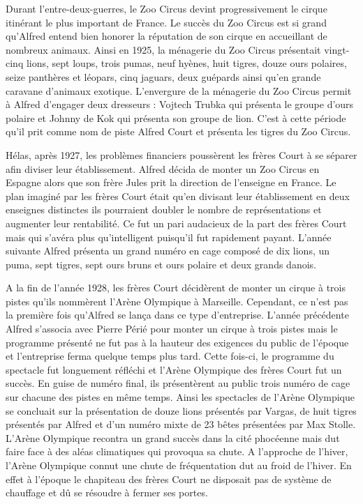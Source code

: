 Durant l’entre-deux-guerres, le Zoo Circus devint progressivement le cirque itinérant le plus important de France. Le succès du Zoo Circus est si grand qu’Alfred entend bien honorer la réputation de son cirque en accueillant de nombreux animaux. Ainsi en 1925, la ménagerie du Zoo Circus présentait vingt-cinq lions, sept loups, trois pumas, neuf hyènes, huit tigres, douze ours polaires, seize panthères et léopars, cinq jaguars, deux guépards ainsi qu’en grande caravane d’animaux exotique. L’envergure de la ménagerie du Zoo Circus permit à Alfred d’engager deux dresseurs : Vojtech Trubka qui présenta le groupe d’ours polaire et Johnny de Kok qui présenta son groupe de lion. C’est à cette période qu’il prit comme nom de piste Alfred Court et présenta les tigres du Zoo Circus. 

Hélas, après 1927, les problèmes financiers poussèrent les frères Court à se séparer afin diviser leur établissement. Alfred décida de monter un Zoo Circus en Espagne alors que son frère Jules prit la direction de l’enseigne en France. Le plan imaginé par les frères Court était qu’en divisant leur établissement en deux enseignes distinctes ils pourraient doubler le nombre de représentations et augmenter leur rentabilité. Ce fut un pari audacieux de la part des frères Court mais qui s’avéra plus qu’intelligent puisqu’il fut rapidement payant. L’année suivante Alfred présenta un grand numéro en cage composé de dix lions, un puma, sept tigres, sept ours bruns et ours polaire et deux grands danois.

A la fin de l’année 1928, les frères Court décidèrent de monter un cirque à trois pistes qu’ils nommèrent l’Arène Olympique à Marseille. Cependant, ce n’est pas la première fois qu’Alfred se lança dans ce type d’entreprise. L’année précédente Alfred s’associa avec Pierre Périé pour monter un cirque à trois pistes mais le programme présenté ne fut pas à la hauteur des exigences du public de l’époque et l’entreprise ferma quelque temps plus tard. Cette fois-ci, le programme du spectacle fut longuement réfléchi et l’Arène Olympique des frères Court fut un succès. En guise de numéro final, ils présentèrent au public trois numéro de cage sur chacune des pistes en même temps. Ainsi les spectacles de l’Arène Olympique se concluait sur la présentation de douze lions présentés par Vargas, de huit tigres présentés par Alfred et d’un numéro mixte de 23 bêtes présentées par Max Stolle. L’Arène Olympique recontra un grand succès dans la cité phocéenne mais dut faire face à des aléas climatiques qui provoqua sa chute. A l’approche de l’hiver, l’Arène Olympique connut une chute de fréquentation dut au froid de l’hiver. En effet à l’époque le chapiteau des frères Court ne disposait pas de système de chauffage et dû se résoudre à fermer ses portes.


